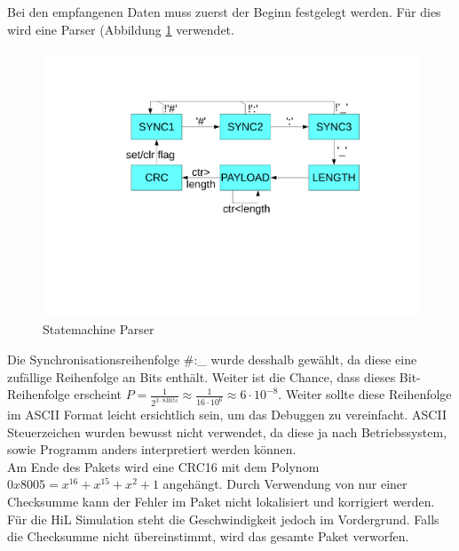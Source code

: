 \clearpage
\noindent Bei den empfangenen Daten muss zuerst der Beginn festgelegt werden. Für dies wird eine Parser (Abbildung \ref{fig:Statemachine Parser} verwendet.


\begin{figure}[ht]
  \begin{center}
  \includegraphics[scale=0.5, trim={6cm 8cm 4cm 4cm},clip]{pic/50_app/statemachine_parser.pdf}
  \caption{Statemachine Parser}
  \label{fig:Statemachine Parser}
  \end{center}
\end{figure}

\noindent Die Synchronisationsreihenfolge \#:\_ wurde desshalb gewählt, da diese eine zufällige Reihenfolge an Bits enthält. Weiter ist die Chance, dass dieses Bit-Reihenfolge erscheint $P = \frac{1}{2^{3\cdot8 Bits}}\approx\frac{1}{16\cdot 10^6} \approx 6 \cdot 10^{-8}$. Weiter sollte diese Reihenfolge im ASCII Format leicht ersichtlich sein, um das Debuggen zu vereinfacht. ASCII Steuerzeichen wurden bewusst nicht verwendet, da diese ja nach Betriebssystem, sowie Programm anders interpretiert werden können. \\
Am Ende des Pakets wird eine CRC16 mit dem Polynom $0x8005 = x^{16} + x^{15} + x^2 + 1$ angehängt. Durch Verwendung von nur einer Checksumme kann der Fehler im Paket nicht lokalisiert und korrigiert werden. Für die HiL Simulation steht die Geschwindigkeit jedoch im Vordergrund. Falls die Checksumme nicht übereinstimmt, wird das gesamte Paket verworfen.

\clearpage
